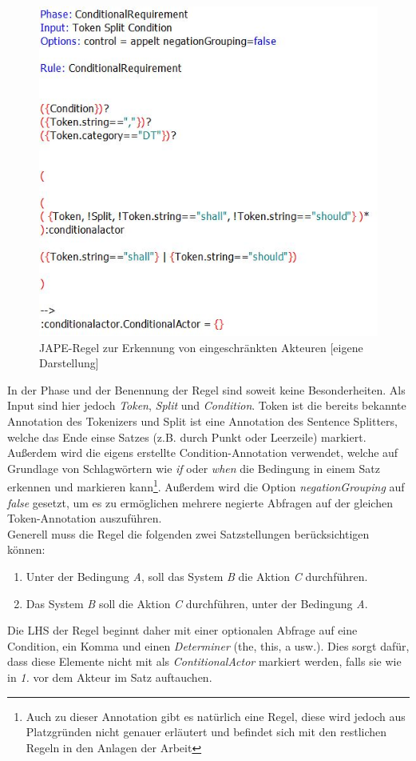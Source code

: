 \documentclass[12pt]{report}
\begin{document}
\begin{figure}[h!]
\begin{center}
\includegraphics[scale=0.8]{Bilder/ConditionalActor.jpg}
\caption{JAPE-Regel zur Erkennung von eingeschränkten Akteuren [eigene Darstellung]}
\end{center}
\end{figure}

In der Phase und der Benennung der Regel sind soweit keine Besonderheiten. Als Input sind hier jedoch \textit{Token}, \textit{Split} und \textit{Condition}. Token ist die bereits bekannte Annotation des Tokenizers und Split ist eine Annotation des Sentence Splitters, welche das Ende einse Satzes (z.B. durch Punkt oder Leerzeile) markiert. Außerdem wird die eigens erstellte Condition-Annotation verwendet, welche auf Grundlage von Schlagwörtern wie \textit{if} oder \textit{when} die Bedingung in einem Satz erkennen und markieren kann\footnote{Auch zu dieser Annotation gibt es natürlich eine Regel, diese wird jedoch aus Platzgründen nicht genauer erläutert und befindet sich mit den restlichen Regeln in den Anlagen der Arbeit}. Außerdem wird die Option \textit{negationGrouping} auf \textit{false} gesetzt, um es zu ermöglichen mehrere negierte Abfragen auf der gleichen Token-Annotation auszuführen. \\

Generell muss die Regel die folgenden zwei Satzstellungen berücksichtigen können: 
\begin{enumerate}
\item Unter der Bedingung \textit{A}, soll das System \textit{B} die Aktion \textit{C} durchführen.
\item Das System \textit{B} soll die Aktion \textit{C} durchführen, unter der Bedingung \textit{A}.
\end{enumerate}
Die LHS der Regel beginnt daher mit einer optionalen Abfrage auf eine Condition, ein Komma und einen \textit{Determiner} (the, this, a usw.). Dies sorgt dafür, dass diese Elemente nicht mit als \textit{ContitionalActor} markiert werden, falls sie wie in \textit{1.} vor dem Akteur im Satz auftauchen. 
\end{document}
